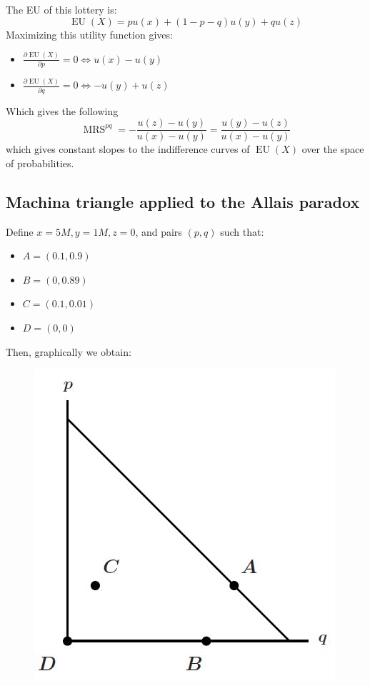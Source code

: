 \documentclass[12pt]{report}
\begin{document}
The EU of this lottery is: $$\operatorname{EU}(X) = pu(x) + (1-p-q)u(y) + qu(z)$$ Maximizing this utility function gives:\begin{itemize}
\item $\frac{\partial \operatorname{EU}(X)}{\partial p} = 0 \Leftrightarrow u(x) - u(y)$
\item $\frac{\partial \operatorname{EU}(X)}{\partial q} = 0 \Leftrightarrow -u(y) + u(z)$
\end{itemize}
Which gives the following $$\operatorname{MRS}^{pq} = -\frac{u(z) - u(y)}{u(x) - u(y)} = \frac{u(y) - u(z)}{u(x) - u(y)} $$ which gives constant slopes to the indifference curves of $\operatorname{EU}(X)$ over the space of probabilities.

\subsection{Machina triangle applied to the Allais paradox}
Define $x = 5M, y =1M, z = 0$, and pairs $(p,q)$ such that:\begin{itemize}
\item $A = (0.1,0.9)$
\item $B = (0, 0.89)$
\item $C = (0.1, 0.01)$
\item $D = (0,0)$
\end{itemize}
Then, graphically we obtain:
\begin{figure}[ht!]
\centering
\includegraphics[scale=0.43]{images/machinaallais}
\end{figure}
\end{document}
